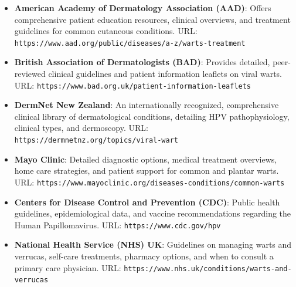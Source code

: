 \begin{itemize}
    \item \textbf{American Academy of Dermatology Association (AAD)}: Offers comprehensive patient education resources, clinical overviews, and treatment guidelines for common cutaneous conditions. URL: \texttt{https://www.aad.org/public/diseases/a-z/warts-treatment}
    \item \textbf{British Association of Dermatologists (BAD)}: Provides detailed, peer-reviewed clinical guidelines and patient information leaflets on viral warts. URL: \texttt{https://www.bad.org.uk/patient-information-leaflets}
    \item \textbf{DermNet New Zealand}: An internationally recognized, comprehensive clinical library of dermatological conditions, detailing HPV pathophysiology, clinical types, and dermoscopy. URL: \texttt{https://dermnetnz.org/topics/viral-wart}
    \item \textbf{Mayo Clinic}: Detailed diagnostic options, medical treatment overviews, home care strategies, and patient support for common and plantar warts. URL: \texttt{https://www.mayoclinic.org/diseases-conditions/common-warts}
    \item \textbf{Centers for Disease Control and Prevention (CDC)}: Public health guidelines, epidemiological data, and vaccine recommendations regarding the Human Papillomavirus. URL: \texttt{https://www.cdc.gov/hpv}
    \item \textbf{National Health Service (NHS) UK}: Guidelines on managing warts and verrucas, self-care treatments, pharmacy options, and when to consult a primary care physician. URL: \texttt{https://www.nhs.uk/conditions/warts-and-verrucas}
\end{itemize}